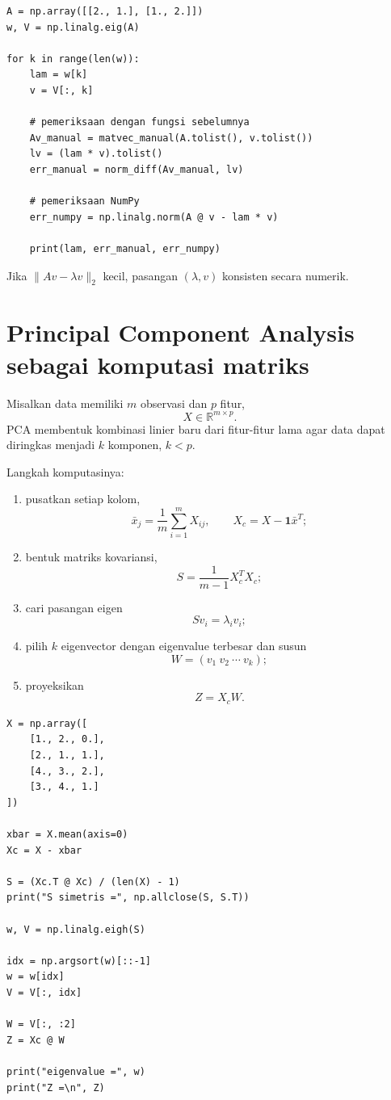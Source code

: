 \documentclass[11pt,a4paper]{report}
\begin{document}
\begin{lstlisting}
A = np.array([[2., 1.], [1., 2.]])
w, V = np.linalg.eig(A)

for k in range(len(w)):
    lam = w[k]
    v = V[:, k]

    # pemeriksaan dengan fungsi sebelumnya
    Av_manual = matvec_manual(A.tolist(), v.tolist())
    lv = (lam * v).tolist()
    err_manual = norm_diff(Av_manual, lv)

    # pemeriksaan NumPy
    err_numpy = np.linalg.norm(A @ v - lam * v)

    print(lam, err_manual, err_numpy)
\end{lstlisting}

Jika $\|Av-\lambda v\|_2$ kecil, pasangan $(\lambda,v)$ konsisten secara numerik.

\section{Principal Component Analysis sebagai komputasi matriks}
Misalkan data memiliki $m$ observasi dan $p$ fitur,
\[
X\in\mathbb{R}^{m\times p}.
\]
PCA membentuk kombinasi linier baru dari fitur-fitur lama agar data dapat diringkas menjadi $k$ komponen, $k<p$.

Langkah komputasinya:
\begin{enumerate}
  \item pusatkan setiap kolom,
  \[
  \bar{x}_j=\frac1m\sum_{i=1}^m X_{ij},
  \qquad
  X_c=X-\mathbf{1}\bar{x}^{T};
  \]
  \item bentuk matriks kovariansi,
  \[
  S=\frac{1}{m-1}X_c^TX_c;
  \]
  \item cari pasangan eigen
  \[
  Sv_i=\lambda_i v_i;
  \]
  \item pilih $k$ eigenvector dengan eigenvalue terbesar dan susun
  \[
  W=(v_1\ v_2\ \cdots\ v_k);
  \]
  \item proyeksikan
  \[
  Z=X_cW.
  \]
\end{enumerate}

\begin{lstlisting}
X = np.array([
    [1., 2., 0.],
    [2., 1., 1.],
    [4., 3., 2.],
    [3., 4., 1.]
])

xbar = X.mean(axis=0)
Xc = X - xbar

S = (Xc.T @ Xc) / (len(X) - 1)
print("S simetris =", np.allclose(S, S.T))

w, V = np.linalg.eigh(S)

idx = np.argsort(w)[::-1]
w = w[idx]
V = V[:, idx]

W = V[:, :2]
Z = Xc @ W

print("eigenvalue =", w)
print("Z =\n", Z)
\end{lstlisting}
\end{document}
